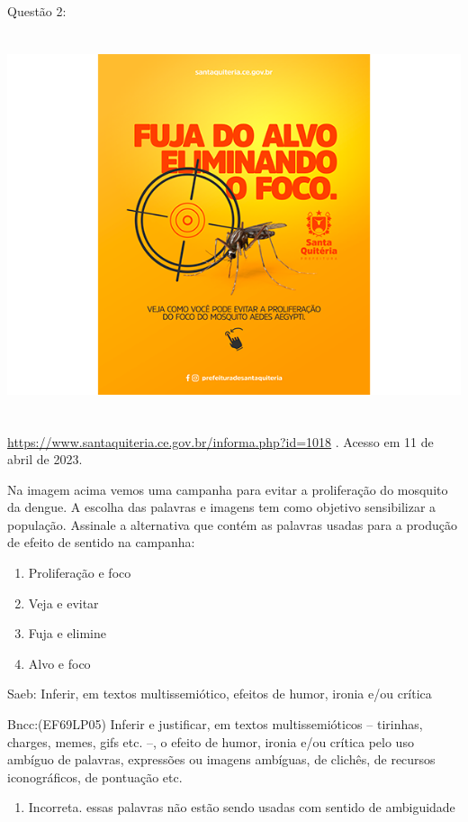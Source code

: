 Questão 2:

\includegraphics[width=5.90551in,height=4.43056in]{./imgSAEB_7_POR/media/image6.png}

\href{https://www.santaquiteria.ce.gov.br/informa.php?id=1018}{\uline{https://www.santaquiteria.ce.gov.br/informa.php?id=1018}}
. Acesso em 11 de abril de 2023.

Na imagem acima vemos uma campanha para evitar a proliferação do
mosquito da dengue. A escolha das palavras e imagens tem como objetivo
sensibilizar a população. Assinale a alternativa que contém as palavras
usadas para a produção de efeito de sentido na campanha:

\begin{enumerate}
\def\labelenumi{\alph{enumi})}
\item
  Proliferação e foco
\item
  Veja e evitar
\item
  Fuja e elimine
\item
  Alvo e foco
\end{enumerate}

Saeb: Inferir, em textos multissemiótico, efeitos de humor, ironia e/ou
crítica

Bncc:(EF69LP05) Inferir e justificar, em textos multissemióticos --
tirinhas, charges, memes, gifs etc. --, o efeito de humor, ironia e/ou
crítica pelo uso ambíguo de palavras, expressões ou imagens ambíguas, de
clichês, de recursos iconográficos, de pontuação etc.

\begin{enumerate}
\def\labelenumi{\arabic{enumi}.}
\tightlist
\item
  Incorreta. essas palavras não estão sendo usadas com sentido de
  ambiguidade
\end{enumerate}


